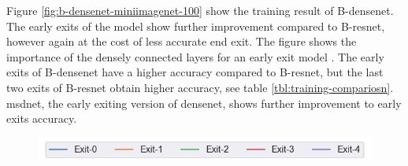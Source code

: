 Figure \ref{fig:b-densenet-miniimagenet-100} show the training result of B-\gls{densenet}. The early exits of the model show further improvement compared to B-\gls{resnet}, however again at the cost of less accurate end exit. The figure shows the importance of the densely connected layers for an early exit model \cite{huang_multi-scale_2017}. The early exits of B-\gls{densenet} have a higher accuracy compared to B-\gls{resnet}, but the last two exits of  B-\gls{resnet} obtain higher accuracy, see table \ref{tbl:training-compariosn}. \gls{msdnet}, the early exiting version of \gls{densenet}, shows further improvement to early exits accuracy.

\begin{figure}
	\centering
	\captionsetup[subfigure]{justification=centering, farskip=1pt,captionskip=1pt}
	\includegraphics[width=.5\textwidth]{figures/training_plots/msdnet_exit_legend}
	\hfill

\end{figure}
